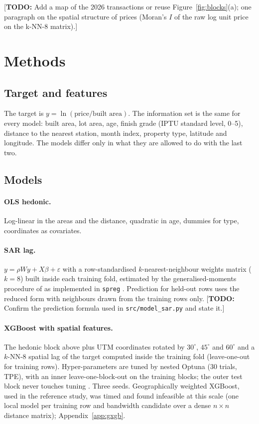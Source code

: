 \documentclass[11pt,a4paper]{article}
\newcommand{\todo}[1]{\textcolor{red!70!black}{[\textbf{TODO:} #1]}}
\begin{document}
\todo{Add a map of the 2026 transactions or reuse Figure~\ref{fig:blocks}(a); one paragraph on
the spatial structure of prices (Moran's $I$ of the raw log unit price on the k-NN-8 matrix).}

\section{Methods}
\label{sec:methods}

\subsection{Target and features}

The target is $y = \ln(\text{price}/\text{built area})$. The information set is the same for every
model: built area, lot area, age, finish grade (IPTU standard level, 0--5), distance to the nearest
station, month index, property type, latitude and longitude. The models differ only in what they
are allowed to do with the last two.

\subsection{Models}

\paragraph{OLS hedonic.} Log-linear in the areas and the distance, quadratic in age, dummies for
type, coordinates as covariates.

\paragraph{SAR lag.} $y = \rho W y + X\beta + \varepsilon$ with a row-standardised $k$-nearest-neighbour
weights matrix ($k = 8$) built inside each training fold, estimated by the generalised-moments
procedure of \citet{kelejian1998} as implemented in \texttt{spreg} \citep{rey2010pysal}.
Prediction for held-out rows uses the reduced form with neighbours drawn from the training rows
only. \todo{Confirm the prediction formula used in \texttt{src/model\_sar.py} and state it.}

\paragraph{XGBoost with spatial features.} The hedonic block above plus UTM coordinates rotated by
$30^\circ$, $45^\circ$ and $60^\circ$ and a $k$-NN-8 spatial lag of the target computed inside the
training fold (leave-one-out for training rows). Hyper-parameters are tuned by nested Optuna
(30 trials, TPE), with an inner leave-one-block-out on the training blocks; the outer test block
never touches tuning \citep{chen2016xgboost,akiba2019optuna}. Three seeds. Geographically weighted
XGBoost, used in the reference study, was timed and found infeasible at this scale
(one local model per training row and bandwidth candidate over a dense $n \times n$ distance
matrix); Appendix~\ref{app:gxgb}.
\end{document}
